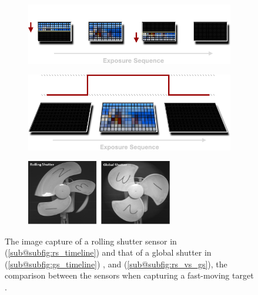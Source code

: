 \begin{figure}[H]
    \centering
    \begin{subfigure}{.45\textwidth}
        \centering
        \includegraphics[width=1\linewidth]{assets/rolling-shutter-timeline.png}
        \caption{}
        \label{subfig:rs_timeline}
    \end{subfigure}
    \hfill
    \begin{subfigure}{.45\textwidth}
        \centering
        \includegraphics[width=1\linewidth]{assets/global-shutter-timeline.png}
        \caption{}
        \label{subfig:gs_timeline}
    \end{subfigure}
    \hfill
    \begin{subfigure}{0.45\textwidth}
        \centering
        \includegraphics[width=0.7\textwidth]{assets/rolling-vs-global-shutter.jpeg}
        \caption{}
        \label{subfig:rs_vs_gs}
    \end{subfigure}
    \caption{The image capture of a rolling shutter sensor in (\ref{sub@subfig:rs_timeline}) and that of a global shutter in (\ref{sub@subfig:gs_timeline}) \cite{reddigitalcinemaGlobalRollingShutters}, and (\ref{sub@subfig:rs_vs_gs}), the comparison between the sensors when capturing a fast-moving target \cite{RollingShutterVs}.}
    \label{fig:rs_vs_gs}
\end{figure}


